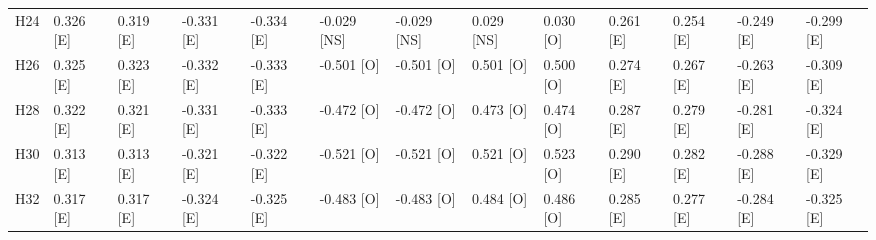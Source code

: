 \begin{table}[tbp]
\begin{tabular}{lllllllllllll}
H24 & 0.326 [E] & 0.319 [E] & -0.331 [E] & -0.334 [E] & -0.029 [NS] & -0.029 [NS] & 0.029 [NS] & 0.030 [O] & 0.261 [E] & 0.254 [E] & -0.249 [E] & -0.299 [E] \\
H26 & 0.325 [E] & 0.323 [E] & -0.332 [E] & -0.333 [E] & -0.501 [O] & -0.501 [O] & 0.501 [O] & 0.500 [O] & 0.274 [E] & 0.267 [E] & -0.263 [E] & -0.309 [E] \\
H28 & 0.322 [E] & 0.321 [E] & -0.331 [E] & -0.333 [E] & -0.472 [O] & -0.472 [O] & 0.473 [O] & 0.474 [O] & 0.287 [E] & 0.279 [E] & -0.281 [E] & -0.324 [E] \\
H30 & 0.313 [E] & 0.313 [E] & -0.321 [E] & -0.322 [E] & -0.521 [O] & -0.521 [O] & 0.521 [O] & 0.523 [O] & 0.290 [E] & 0.282 [E] & -0.288 [E] & -0.329 [E] \\
H32 & 0.317 [E] & 0.317 [E] & -0.324 [E] & -0.325 [E] & -0.483 [O] & -0.483 [O] & 0.484 [O] & 0.486 [O] & 0.285 [E] & 0.277 [E] & -0.284 [E] & -0.325 [E] \\
\bottomrule
\end{tabular}
\end{table}
